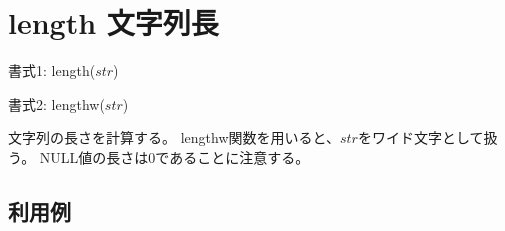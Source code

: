 
%

\section{length 文字列長\label{sect:length}}

書式1: length($str$)

書式2: lengthw($str$)

文字列の長さを計算する。
lengthw関数を用いると、$str$をワイド文字として扱う。
NULL値の長さは0であることに注意する。

\subsection*{利用例}


%

